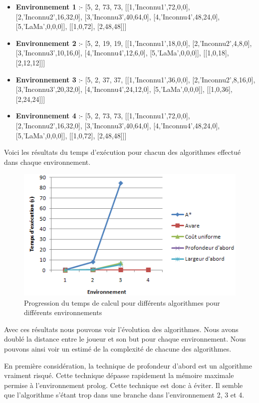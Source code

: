 \documentclass[12pt,english,frenchb,letterpaper]{article}
\begin{document}
\begin{itemize}
\item 
\textbf{Environnement 1} :- 
[5, 2, 73, 73, [[1,'Inconnu1',72,0,0], [2,'Inconnu2',16,32,0], [3,'Inconnu3',40,64,0], [4,'Inconnu4',48,24,0], [5,'LaMa',0,0,0]], [[1,0,72], [2,48,48]]]
\item 
\textbf{Environnement 2} :- 
[5, 2, 19, 19, [[1,'Inconnu1',18,0,0], [2,'Inconnu2',4,8,0], [3,'Inconnu3',10,16,0], [4,'Inconnu4',12,6,0], [5,'LaMa',0,0,0]], [[1,0,18], [2,12,12]]]
\item 
\textbf{Environnement 3} :- 
[5, 2, 37, 37, [[1,'Inconnu1',36,0,0], [2,'Inconnu2',8,16,0], [3,'Inconnu3',20,32,0], [4,'Inconnu4',24,12,0], [5,'LaMa',0,0,0]], [[1,0,36], [2,24,24]]]
\item 
\textbf{Environnement 4} :- 
[5, 2, 73, 73, [[1,'Inconnu1',72,0,0], [2,'Inconnu2',16,32,0], [3,'Inconnu3',40,64,0], [4,'Inconnu4',48,24,0], [5,'LaMa',0,0,0]], [[1,0,72], [2,48,48]]]
\end{itemize}


Voici les résultats du temps d'exécution pour chacun des algorithmes effectué dans chaque environnement.

\begin{figure}[!h] %
\includegraphics[width=6in]{resultats-planif} %
\caption{Progression du temps de calcul pour différents algorithmes pour différents environnements} 
\end{figure}

Avec ces résultats nous pouvons voir l'évolution des algorithmes. Nous avons doublé la distance entre le joueur et son but pour chaque environnement. Nous pouvons ainsi voir un estimé de la complexité de chacune des algorithmes.

En première considération, la technique de profondeur d'abord est un algorithme vraiment risqué. Cette technique dépasse rapidement la mémoire maximale permise à l'environnement prolog. Cette technique est donc à éviter. Il semble que l'algorithme s'étant trop dans une branche dans l'environnement 2, 3 et 4.
\end{document}
